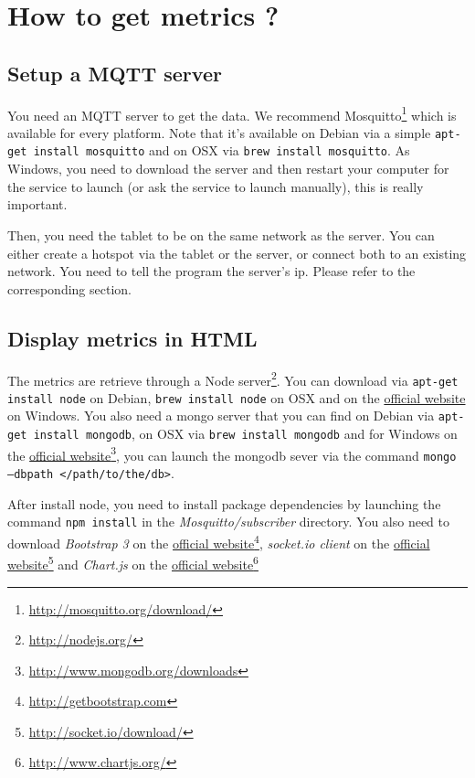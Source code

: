 \documentclass[a4paper,11pt]{report}
\begin{document}
\section{How to get metrics ?}

\subsection{Setup a MQTT server}

You need an MQTT server to get the data. We recommend
Mosquitto\footnote{\url{http://mosquitto.org/download/}} which is available for every
platform. Note that it's available on Debian via a simple \texttt{apt-get install
mosquitto} and on OSX via \texttt{brew install mosquitto}. As Windows, you need to
download the server and then restart your computer for the service to launch (or ask the
service to launch manually), this is really important.

Then, you need the tablet to be on the same network as the server. You can
either create a hotspot via the tablet or the server, or connect both to an
existing network. You need to tell the program the server's ip. Please refer
to the corresponding section.

\subsection{Display metrics in HTML}

The metrics are retrieve through a Node
server\footnote{\url{http://nodejs.org/}}. You can download via \texttt{apt-get
install node} on Debian, \texttt{brew install node} on OSX and on the
\href{http://nodejs.org}{official website} on Windows. You also need a mongo
server that you can find on Debian via \texttt{apt-get install mongodb}, on OSX
via \texttt{brew install mongodb} and for Windows on the
\href{http://www.mongodb.org/downloads}{official
website}\footnote{\url{http://www.mongodb.org/downloads}}, you can launch the
mongodb sever via the command \texttt{mongo --dbpath </path/to/the/db>}.

After install node, you need to install package dependencies by launching the
command \texttt{npm install} in the \emph{Mosquitto/subscriber} directory. You
also need to download \emph{Bootstrap 3} on the
\href{http://getbootstrap.com/}{official
website}\footnote{\url{http://getbootstrap.com}}, \emph{socket.io client} on
the \href{http://socket.io/download/}{official
website}\footnote{\url{http://socket.io/download/}} and \emph{Chart.js} on the
\href{http://www.chartjs.org/}{official
website}\footnote{\url{http://www.chartjs.org/}}
\end{document}
